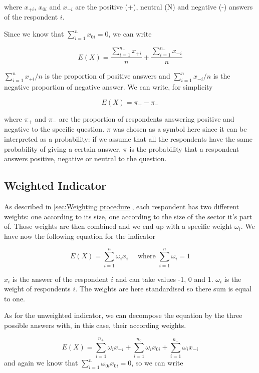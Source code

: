 \documentclass[12pt,a4paper,oneside]{book}
\begin{document}
where 
$x_{+i}$, $x_{0i}$ and $x_{-i}$ are the positive (+), neutral (N) and negative (-) answers of the respondent $i$.

Since we know that $\sum_{i=1}^n x_{0i} = 0$, we can write

\begin{equation}
    E(X) = \frac{\sum_{i=1}^{n_+} x_{+i}}{n}  + \frac{\sum_{i=1}^{n_-} x_{-i}}{n}
\end{equation} 

${\sum_{i=1}^n x_{+i}}/{n}$ is the proportion of positive answers and ${\sum_{i=1}^n x_{-i}}/{n}$ is the negative proportion of negative answer. We can write, for simplicity

\begin{equation}
    E(X) = \pi_+ - \pi_-  \label{eq: BSI Unweighted}
\end{equation}

where $\pi_+$ and $\pi_-$ are the proportion of respondents answering positive and negative to the specific question.
$\pi$ was chosen as a symbol here since it can be interpreted as a probability: if we assume that all the respondents have the same probability of giving a certain answer, $\pi$ is the probability that a respondent answers positive, negative or neutral to the question. 


\subsection{Weighted Indicator}

As described in \autoref{sec:Weighting procedure}, each respondent has two different weights: one according to its size, one according to the size of the sector it's part of. Those weights are then combined and we end up with a specific weight $\omega_i$.
We have now the following equation for the indicator

\begin{equation}
    E(X) = \sum_{i=1}^n \omega_i x_i  \quad \text{  where  } \sum_{i=1}^n \omega_i =  1
\end{equation} 

$x_i$ is the answer of the respondent $i$ and can take values -1, 0 and 1.
$\omega_i$ is the weight of respondents $i$. 
The weights are here standardised so there sum is equal to one.

As for the unweighted indicator, we can decompose the equation by the three possible answers with, in this case, their according weights.

\begin{equation}
    E(X) = \sum_{i=1}^{n_+} \omega_{i} x_{+i} + \sum_{i=1}^{n_0} \omega_{i} x_{0i} + \sum_{i=1}^{n_-} \omega_{i} x_{-i}
 \end{equation}
and again we know that $\sum_{i=1}^n \omega_{0i} x_{0i} = 0$, so we can write
\end{document}

